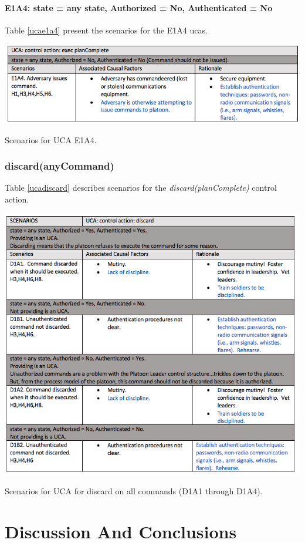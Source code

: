 \documentclass[../../main/main.tex]{subfiles}
\begin{document}
\paragraph*{E1A4: state  = any state, Authorized = No, Authenticated = No}
Table \ref{ucae1a4}  present the scenarios for the E1A4 \glspl{uca}.

\begin{table}[ht!]
\begin{center}
\includegraphics[width=\linewidth]{../figures/ucae1a4}
\caption{Scenarios for UCA E1A4.}
\label{ucae1a4}
\end{center}
\end{table}
\clearpage


\subsubsection*{discard(anyCommand)}
Table \ref{ucadiscard} describes scenarios for the \textit{discard(planComplete)} control action.

\begin{table}[ht!]
\begin{center}
\includegraphics[width=\linewidth]{../figures/ucadiscard}
\caption{Scenarios for UCA for discard on all commands (D1A1 through D1A4).}
\label{ucadiscard}
\end{center}
\end{table}
\clearpage

\section{Discussion And Conclusions}\label{chp:stpapb:discuss}
\end{document}
